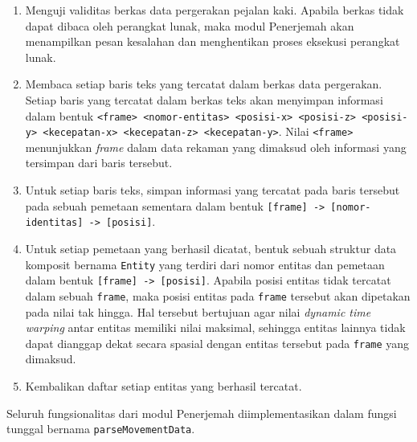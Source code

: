 \begin{enumerate}
    \item Menguji validitas berkas data pergerakan pejalan kaki. Apabila berkas tidak dapat dibaca oleh perangkat lunak, maka modul Penerjemah akan menampilkan pesan kesalahan dan menghentikan proses eksekusi perangkat lunak.
    \item Membaca setiap baris teks yang tercatat dalam berkas data pergerakan. Setiap baris yang tercatat dalam berkas teks akan menyimpan informasi dalam bentuk \texttt{<frame> <nomor-entitas> <posisi-x> <posisi-z> <posisi-y> <kecepatan-x> <kecepatan-z> <kecepatan-y>}. Nilai \texttt{<frame>} menunjukkan \textit{frame} dalam data rekaman yang dimaksud oleh informasi yang tersimpan dari baris tersebut. 
    \item Untuk setiap baris teks, simpan informasi yang tercatat pada baris tersebut pada sebuah pemetaan sementara dalam bentuk \texttt{[frame] -> [nomor-identitas] -> [posisi]}.
    \item Untuk setiap pemetaan yang berhasil dicatat, bentuk sebuah struktur data komposit bernama \texttt{Entity} yang terdiri dari nomor entitas dan pemetaan dalam bentuk \texttt{[frame] -> [posisi]}. Apabila posisi entitas tidak tercatat dalam sebuah \texttt{frame}, maka posisi entitas pada \texttt{frame} tersebut akan dipetakan pada nilai tak hingga. Hal tersebut bertujuan agar nilai \textit{dynamic time warping} antar entitas memiliki nilai maksimal, sehingga entitas lainnya tidak dapat dianggap dekat secara spasial dengan entitas tersebut pada \texttt{frame} yang dimaksud.
    \item Kembalikan daftar setiap entitas yang berhasil tercatat.
\end{enumerate}

Seluruh fungsionalitas dari modul Penerjemah diimplementasikan dalam fungsi tunggal bernama \texttt{parseMovementData}.